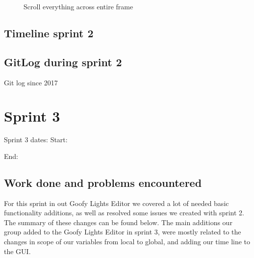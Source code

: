 \documentclass[11pt]{article} %
\begin{document}
{\begin{figure}[H]
	\centering
	\caption{Scroll everything across entire frame}
	\label{fig:UC14}
\end{figure}

\newpage
\subsection{Timeline sprint 2}


\newpage
\subsection{GitLog during sprint 2}
Git log since 2017


\newpage
\section{Sprint 3}
Sprint 3 dates:  Start: \date{4/11/2017}  End: \date{4/19/2017}

\subsection{Work done and problems encountered}
For this sprint in out Goofy Lights Editor we covered a lot of needed basic functionality additions, as well as resolved some issues we created with sprint 2. The summary of these changes can be found below.
The main additions our group added to the Goofy Lights Editor in sprint 3, were mostly related to the changes in scope of our variables from local to global, and adding our time line to the GUI.

}
\end{document}
